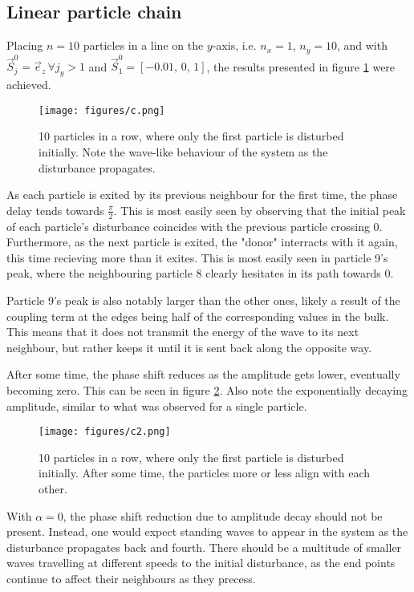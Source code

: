 
\subsection*{Linear particle chain}

Placing $n = 10$ particles in a line on the $y$-axis, i.e. $n_x = 1$, $n_y = 10$, and with
$\vec{S}_j^0 = \vec{e}_z \,\forall j_y>1$ and $\vec{S}_1^0 = \left[-0.01,\,0,\,1\right]$, 
the results presented in figure \ref{fig:c1} were achieved. 

\begin{figure}
    \centering
    \texttt{[image: figures/c.png]}
    \caption{
        10 particles in a row, where only the first particle is disturbed initially.
        Note the wave-like behaviour of the system as the disturbance propagates.
    }
    \label{fig:c1}
\end{figure}

As each particle is exited by its previous neighbour for the first time, the phase
delay tends towards $\frac{\pi}{2}$. This is most easily seen by observing that the initial peak
of each particle's disturbance coincides with the previous particle crossing 0.
Furthermore, as the next particle is exited, the "donor" interracts with it again, 
this time recieving more than it exites. This is most easily seen in particle 9's peak, 
where the neighbouring particle 8 clearly hesitates in its path towards 0. 

Particle 9's peak is also notably larger than the other ones, 
likely a result of the coupling term at the edges being half of the corresponding values in the bulk.
This means that it does not transmit the energy of the wave to its next neighbour, 
but rather keeps it until it is sent back along the opposite way.

After some time, the phase shift reduces as the amplitude gets lower, eventually
becoming zero. This can be seen in figure \ref{fig:c2}. Also note the exponentially decaying amplitude,
similar to what was observed for a single particle. 

\begin{figure}
    \centering
    \texttt{[image: figures/c2.png]}
    \caption{
        10 particles in a row, where only the first particle is disturbed initially.
        After some time, the particles more or less align with each other.
    }
    \label{fig:c2}
\end{figure}

With $\alpha = 0$, the phase shift reduction due to amplitude decay should not be present.
Instead, one would expect standing waves to appear in the system as the disturbance propagates
back and fourth. There should be a multitude of smaller waves travelling at different speeds to the
initial disturbance, as the end points continue to affect their neighbours as they precess.

